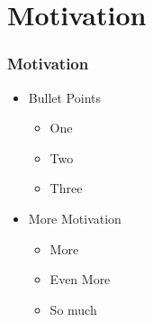 
\section{Motivation}
\begin{frame}
\frametitle{Motivation}

\begin{itemize}
  \item Bullet Points
    \begin{itemize}
        \item One
        \item Two
        \item Three
    \end{itemize}
    \item More Motivation
    \begin{itemize}
        \item More
        \item Even More
        \item So much
    \end{itemize}
\end{itemize}

\end{frame}